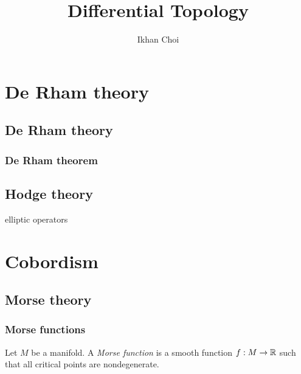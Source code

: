 \documentclass{../../large}
\begin{document}
\title{Differential Topology}
\author{Ikhan Choi}
\maketitle
\tableofcontents


\part{De Rham theory}
\chapter{De Rham theory}
\section{De Rham theorem}

\chapter{Hodge theory}
elliptic operators


\part{Cobordism}
\chapter{Morse theory}


\section{Morse functions}

\begin{defn}
Let $M$ be a manifold.
A \emph{Morse function} is a smooth function $f:M\to\mathbb{R}$ such that all critical points are nondegenerate.
\end{defn}
\end{document}

